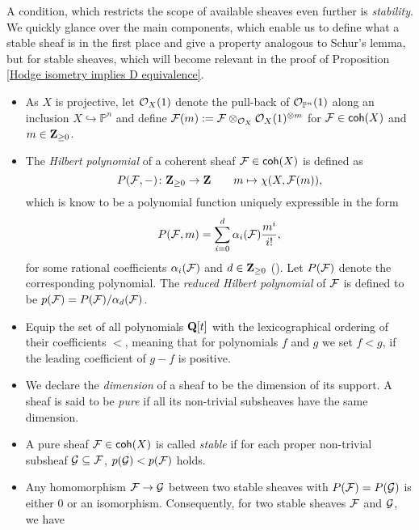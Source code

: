 A condition, which restricts the scope of available sheaves even further is \emph{stability}. We quickly glance over the main components, which enable us to define what a stable sheaf is in the first place and give a property analogous to Schur's lemma, but for stable sheaves, which will become relevant in the proof of Proposition \ref{Hodge isometry implies D equivalence}.
\begin{itemize}[label = $\vartriangleright$]
    \item{
        As $X$ is projective, let ${\mathcal{O}_{X}}(1)$ denote the pull-back of ${\mathcal{O}_{\mathbb P^n}}(1)$ along an inclusion $X \hookrightarrow \mathbb{P}^n$ and define $\mathcal F(m) := \mathcal F \otimes_{{\mathcal{O}_{X}}} {\mathcal{O}_{X}}(1)^{\otimes m}$ for $\mathcal F \in \mathsf{coh}(X)$ and $m \in \mathbf Z_{\geq 0}$.
        }
    \item{
        The \emph{Hilbert polynomial} of a coherent sheaf $\mathcal F \in \mathsf{coh}(X)$ is defined as
        \[
            P(\mathcal F, -) \colon \mathbf Z_{\geq 0} \to \mathbf Z \qquad m \mapsto \chi(X, \mathcal F(m)),
        \]
        which is know to be a polynomial function uniquely expressible in the form 
        \[
            P(\mathcal F, m) = \sum_{i = 0}^d \alpha_i(\mathcal F)\frac{m^i}{i!},
        \]
        for some rational coefficients $\alpha_i(\mathcal F)$ and $d \in \mathbf Z_{\geq 0}$ (\cf \cite[Part I, \S 1.2, Lemma 1.2.1]{HuybrechtsLehn2010}). Let $P(\mathcal F)$ denote the corresponding polynomial. The \emph{reduced Hilbert polynomial} of $\mathcal F$ is defined to be $p(\mathcal F) = P(\mathcal F)/\alpha_d(\mathcal F)$.
    }
    \item{
        Equip the set of all polynomials $\mathbf Q[t]$ with the lexicographical ordering of their coefficients $<$, meaning that for polynomials $f$ and $g$ we set $f < g$, if the leading coefficient of $g - f$ is positive. 
    }
    \item{
        We declare the \emph{dimension} of a sheaf to be the dimension of its support.
        A sheaf is said to be \emph{pure} if all its non-trivial subsheaves have the same dimension. 
    }
    \item{
        A pure sheaf $\mathcal F \in \mathsf{coh}(X)$ is called \emph{stable} if for each proper non-trivial subsheaf $\mathcal G \subseteq \mathcal F$, $p(\mathcal G) < p(\mathcal F)$ holds. 
    }
    \item{
        Any homomorphism $\mathcal F \to \mathcal G$ between two stable sheaves with $P(\mathcal F) = P(\mathcal G)$ is either $0$ or an isomorphism. Consequently, for two stable sheaves $\mathcal F$ and $\mathcal G$, we have
}
\end{itemize}
